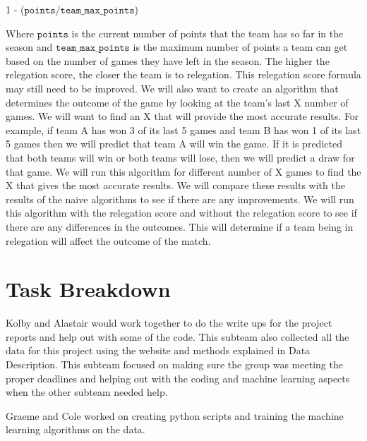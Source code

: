 \documentclass[conference]{IEEEtran}
\begin{document}
\begin{center}
	1 - ($\mathtt{points}$/$\mathtt{team\_max\_points}$)
\end{center}

Where $\mathtt{points}$ is the current number of points that the team has so far in the season and $\mathtt{team\_max\_points}$ is the maximum number of points a team can get based on the number of games they have left in the season. The higher the relegation score, the closer the team is to relegation. This relegation score formula may still need to be improved.
We will also want to create an algorithm that determines the outcome of the game by looking at the team's last X number of games. We will want to find an X that will provide the most accurate results. For example, if team A has won 3 of its last 5 games and team B has won 1 of its last 5 games then we will predict that team A will win the game. If it is predicted that both teams will win or both teams will lose, then we will predict a draw for that game. We will run this algorithm for different number of X games to find the X that gives the most accurate results. We will compare these results with the results of the naive algorithms to see if there are any improvements. We will run this algorithm with the relegation score and without the relegation score to see if there are any differences in the outcomes. This will determine if a team being in relegation will affect the outcome of the match. 

\section{Task Breakdown}
Kolby and Alastair would work together to do the write ups for the project reports and help out with some of the code. This subteam also collected all the data for this project using the website and methods explained in Data Description. This subteam focused on making sure the group was meeting the proper deadlines and helping out with the coding and machine learning aspects when the other subteam needed help.

Graeme and Cole worked on creating python scripts and training the machine learning algorithms on the data. 

\nocite{*}




\end{document}
